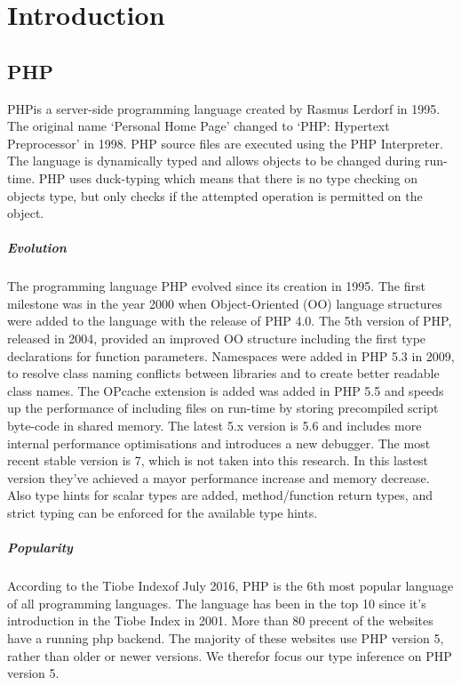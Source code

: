 \documentclass[../main.tex]{subfiles}
\begin{document}
    \chapter{Introduction}\label{ch:introduction}

    \section{PHP}
        PHP\footnotemark is a server-side programming language created by Rasmus Lerdorf in 1995.
        The original name `Personal Home Page' changed to `PHP: Hypertext Preprocessor' in 1998.
        PHP source files are executed using the PHP Interpreter. 
        The language is dynamically typed and allows objects to be changed during run-time.
        PHP uses duck-typing which means that there is no type checking on objects type, but only checks if the attempted operation is permitted on the object.
        
        \paragraph{Evolution}
        The programming language PHP evolved since its creation in 1995.
        The first milestone was in the year 2000 when Object-Oriented (OO) language structures were added to the language with the release of PHP 4.0.
        The 5th version of PHP, released in 2004, provided an improved OO structure  including the first type declarations for function parameters.
        Namespaces were added in PHP 5.3 in 2009, to resolve class naming conflicts between libraries and to create better readable class names.
        The OPcache extension is added was added in PHP 5.5 and speeds up the performance of including files on run-time by storing precompiled script byte-code in shared memory.
        The latest 5.x version is 5.6 and includes more internal performance optimisations and introduces a new debugger.
        The most recent stable version is 7, which is not taken into this research.
        In this lastest version they've achieved a mayor performance increase and memory decrease.
        Also type hints for scalar types are added, method/function return types, and strict typing can be enforced for the available type hints.
       
        \paragraph{Popularity}
        According to the Tiobe Index\footnotemark of July 2016, PHP is the 6th most popular language of all programming languages.
        The language has been in the top 10 since it's introduction in the Tiobe Index in 2001.
        More than 80 precent of the websites have a running php backend\footnotemark.
        The majority of these websites use PHP version 5, rather than older or newer versions.
        We therefor focus our type inference on PHP version 5.
\end{document}
